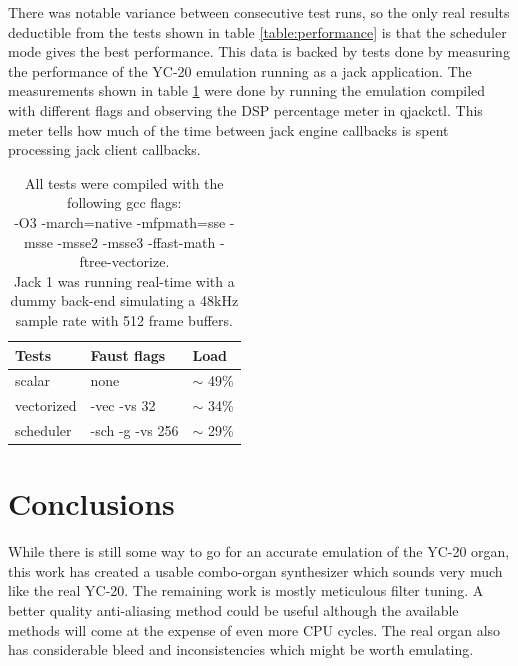 \documentclass[11pt,a4paper]{article}
\begin{document}
There was notable variance between consecutive test runs, so the only real results deductible from the tests shown in table \ref{table:performance} is that the scheduler mode gives the best performance. This data is backed by tests done by measuring the performance of the YC-20 emulation running as a jack application. The measurements shown in table \ref{table:performance2} were done by running the emulation compiled with different flags and observing the DSP percentage meter in qjackctl. This meter tells how much of the time between jack engine callbacks is spent processing jack client callbacks.

\begin{table}[h]
 \begin{center}
\begin{tabular}{|l|l|l|}

      \hline
      Tests         & Faust flags & Load   \\
      \hline\hline
      scalar        & none & $\sim$ 49\% \\
      vectorized    & -vec -vs 32 & $\sim$ 34\% \\
      scheduler     & -sch -g -vs 256 & $\sim$ 29\% \\
      \hline

\end{tabular}
\caption{All tests were compiled with the following gcc flags: \\
-O3 -march=native -mfpmath=sse -msse -msse2 -msse3 -ffast-math -ftree-vectorize. \\
Jack 1 was running real-time with a dummy back-end simulating a 48kHz sample rate with 512 frame buffers.
}\label{table:performance2}
 \end{center}
\end{table}



\section{Conclusions}

While there is still some way to go for an accurate emulation of the YC-20 organ, this work has created a usable combo-organ synthesizer which sounds very much like the real YC-20. The remaining work is mostly meticulous filter tuning. A better quality anti-aliasing method could be useful although the available methods will come at the expense of even more CPU cycles. The real organ also has considerable bleed and inconsistencies which might be worth emulating.
\end{document}

